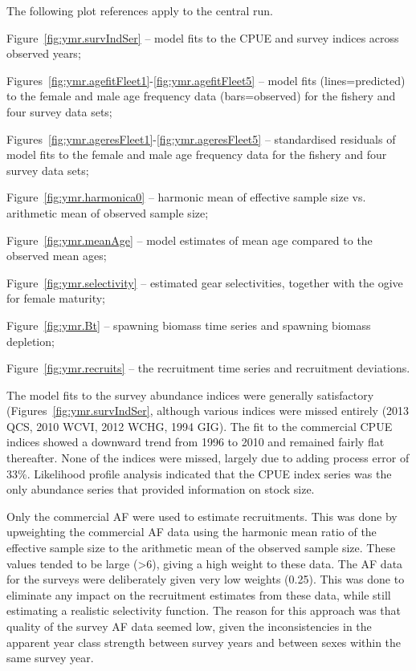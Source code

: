 \documentclass[11pt]{book}
\newcommand{\pc}{\%}
\begin{document}
The following plot references apply to the central run.
\vspace{-0.5\baselineskip}%
\begin{itemize_csas}
  \item Figure~\ref{fig:ymr.survIndSer} -- model fits to the CPUE and survey indices across observed years;
  \item Figures~\ref{fig:ymr.agefitFleet1}-\ref{fig:ymr.agefitFleet5} -- model fits (lines=predicted) to the female and male age frequency data (bars=observed) for the fishery and four survey data sets;
  \item Figures~\ref{fig:ymr.ageresFleet1}-\ref{fig:ymr.ageresFleet5} -- standardised residuals of model fits to the female and male age frequency data for the fishery and four survey data sets;
  \item Figure~\ref{fig:ymr.harmonica0} -- harmonic mean of effective sample size vs. arithmetic mean of observed sample size;
  \item Figure~\ref{fig:ymr.meanAge} -- model estimates of mean age compared to the observed mean ages;
  \item Figure~\ref{fig:ymr.selectivity} -- estimated gear selectivities, together with the ogive for female maturity;
  \item Figure~\ref{fig:ymr.Bt} -- spawning biomass time series and spawning biomass depletion;
  \item Figure~\ref{fig:ymr.recruits} -- the recruitment time series and recruitment deviations.
\end{itemize_csas}


The model fits to the survey abundance indices were generally satisfactory (Figures~\ref{fig:ymr.survIndSer}, although various indices were missed entirely (2013 QCS, 2010 WCVI, 2012 WCHG, 1994 GIG).
The fit to the commercial CPUE indices showed a downward trend from 1996 to 2010 and remained fairly flat thereafter.
None of the indices were missed, largely due to adding process error of 33\pc.
Likelihood profile analysis indicated that the CPUE index series was the only abundance series that provided information on stock size.

Only the commercial AF were used to estimate recruitments.
This was done by upweighting the commercial AF data using the harmonic mean ratio of the effective sample size to the arithmetic mean of the observed sample size.
These values tended to be large (>6), giving a high weight to these data.
The AF data for the surveys were deliberately given very low weights (0.25).
This was done to eliminate any impact on the recruitment estimates from these data, while still estimating a realistic selectivity function.
The reason for this approach was that quality of the survey AF data seemed low, given the inconsistencies in the apparent year class strength between survey years and between sexes within the same survey year.
\end{document}
